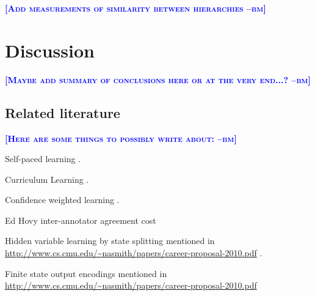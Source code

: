 \documentclass{article} %
\newcommand{\bmcomment}[1]{\textcolor{blue}{\textsc{\textbf{[#1 --bm]}}}}
\begin{document}
\bmcomment{Add measurements of similarity between hierarchies}


%
% 
% 


\section{Discussion}

\bmcomment{Maybe add summary of conclusions here or at the 
very end...?}

\subsection{Related literature}

\bmcomment{Here are some things to possibly write about:}

Self-paced learning \citep{kumar2010self}.

Curriculum Learning \citep{bengio2009curriculum}.

Confidence weighted learning \citep{dredze2008confidence}.

Ed Hovy inter-annotator agreement cost \citep{plank2014learning}

Hidden variable learning by state splitting mentioned in 
\url{http://www.cs.cmu.edu/~nasmith/papers/career-proposal-2010.pdf} 
\citep{petrov2011coarse}.

Finite state output encodings mentioned in 
\url{http://www.cs.cmu.edu/~nasmith/papers/career-proposal-2010.pdf}
\citep{loper2008encoding}
\end{document}
